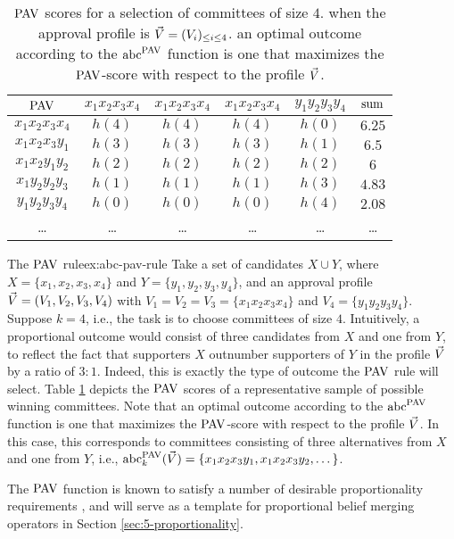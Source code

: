 \begin{table}\centering
\begin{tabular}{cccccc}
	\toprule
	$\mathrm{PAV}$      & $x_1x_2x_3x_4$ & $x_1x_2x_3x_4$ & $x_1x_2x_3x_4$ & $y_1y_2y_3y_4$ & ${\operatorname{sum}}$\\
	\midrule
	$x_1x_2x_3x_4$   &     $h(4)$     &    $h(4)$      &    $h(4)$      &      $h(0)$    &  $6.25$\\
	$x_1x_2x_3y_1$   &     $h(3)$     &    $h(3)$      &    $h(3)$      &      $h(1)$    &  $\mathbf{6.5}$\\
	$x_1x_2y_1y_2$   &     $h(2)$     &    $h(2)$      &    $h(2)$      &      $h(2)$    &  $6$\\
	$x_1y_2y_2y_3$   &     $h(1)$     &    $h(1)$      &    $h(1)$      &      $h(3)$    &  $4.83$\\
	$y_1y_2y_3y_4$   &     $h(0)$     &    $h(0)$      &    $h(0)$      &      $h(4)$    &  $2.08$\\
	\dots 			 &		\dots     &     \dots      &    \dots       &       \dots    &  \dots   \\
	\bottomrule
\end{tabular}
\caption{
$\mathrm{PAV}$ scores for a selection of committees of size $4$.
when the approval profile is $\vec{V}=(V_i)_{\le i\le 4}$.
an optimal outcome according to the ${\operatorname{abc}}^{\mathrm{PAV}}$ function 
is one that maximizes 
the $\mathrm{PAV}$-score with respect to the profile $\vec{V}$.
}
\label{tab:2-abc-pav-rule}
\end{table}

\begin{xmpl}{The $\mathrm{PAV}$ rule}{ex:abc-pav-rule}
	Take a set of candidates $X\cup Y$,
	where $X=\{x_1,x_2,x_3,x_4\}$ 
	and 
	$Y=\{y_1,y_2,y_3,y_4\}$,
	and an approval profile $\vec{V}=(V_1,V_2,V_3,V_4)$
	with $V_1=V_2=V_3=\{x_1x_2x_3x_4\}$ and $V_4=\{y_1y_2y_3y_4\}$.
	Suppose $k=4$, i.e., the task is to choose committees of size $4$.
	Intuitively, a proportional outcome would consist of three candidates from $X$
	and one from $Y$, to reflect the fact that supporters $X$ outnumber
	supporters of $Y$ in the profile $\vec{V}$ by a ratio of $3{:}1$.
	Indeed, this is exactly the type of outcome the $\mathrm{PAV}$ rule will select.
	Table \ref{tab:2-abc-pav-rule} depicts the $\mathrm{PAV}$ scores
	of a representative sample of possible winning committees.
	Note that an optimal outcome according to the ${\operatorname{abc}}^{\mathrm{PAV}}$ function 
	is one that maximizes 
	the $\mathrm{PAV}$-score with respect to the profile $\vec{V}$.
	In this case, this corresponds to committees consisting of three 
	alternatives from $X$ and one from $Y$, i.e.,
	${\operatorname{abc}}_k^{\mathrm{PAV}}(\vec{V})=\{x_1x_2x_3y_1,x_1x_2x_3y_2,\dots\}$.
\end{xmpl}

The $\mathrm{PAV}$ function is known to satisfy a number of desirable proportionality 
requirements \cite{AzizBCEFW17}, and will serve as a template 
for proportional belief merging operators in Section \ref{sec:5-proportionality}.

